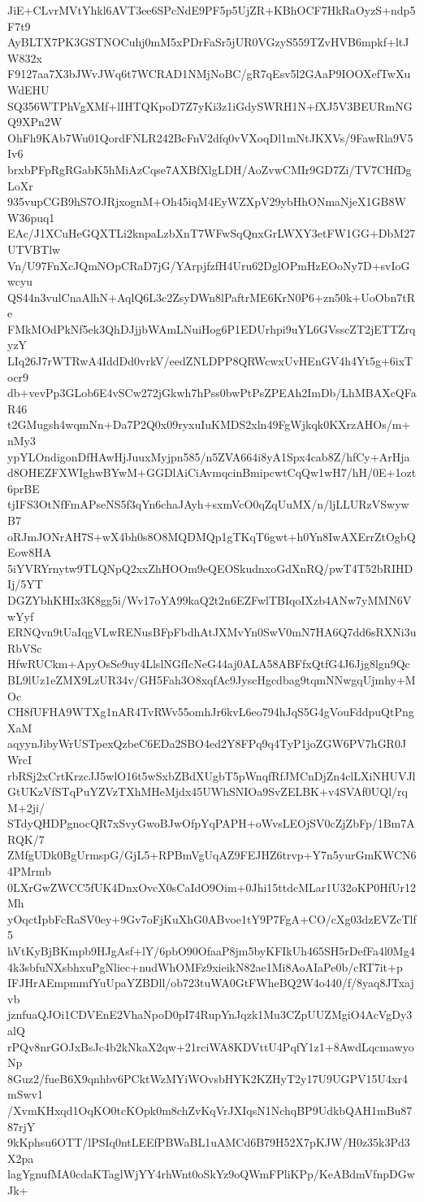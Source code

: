 JiE+CLvrMVtYhkl6AVT3ee6SPcNdE9PF5p5UjZR+KBhOCF7HkRaOyzS+ndp5F7t9
AyBLTX7PK3GSTNOCuhj0mM5xPDrFaSr5jUR0VGzyS559TZvHVB6mpkf+ltJW832x
F9127aa7X3bJWvJWq6t7WCRAD1NMjNoBC/gR7qEsv5l2GAaP9IOOXefTwXuWdEHU
SQ356WTPhVgXMf+lIHTQKpoD7Z7yKi3z1iGdySWRH1N+fXJ5V3BEURmNGQ9XPn2W
OhFh9KAb7Wu01QordFNLR242BcFnV2dfq0vVXoqDl1mNtJKXVs/9FawRla9V5Iv6
brxbPFpRgRGabK5hMiAzCqse7AXBfXlgLDH/AoZvwCMIr9GD7Zi/TV7CHfDgLoXr
935vupCGB9hS7OJRjxognM+Oh45iqM4EyWZXpV29ybHhONmaNjeX1GB8WW36puq1
EAc/J1XCuHeGQXTLi2knpaLzbXnT7WFwSqQnxGrLWXY3etFW1GG+DbM27UTVBTlw
Vn/U97FnXcJQmNOpCRaD7jG/YArpjfzfH4Uru62DglOPmHzEOoNy7D+svIoGwcyu
QS44n3vulCnaAlhN+AqlQ6L3c2ZsyDWn8lPaftrME6KrN0P6+zn50k+UoObn7tRe
FMkMOdPkNf5ek3QhDJjjbWAmLNuiHog6P1EDUrhpi9uYL6GVsscZT2jETTZrqyzY
LIq26J7rWTRwA4IddDd0vrkV/eedZNLDPP8QRWcwxUvHEnGV4h4Yt5g+6ixTocr9
db+vevPp3GLob6E4vSCw272jGkwh7hPss0bwPtPsZPEAh2ImDb/LhMBAXcQFaR46
t2GMugsh4wqmNn+Da7P2Q0x09ryxuIuKMDS2xln49FgWjkqk0KXrzAHOs/m+nMy3
ypYLOndigonDfHAwHjJuuxMyjpn585/n5ZVA664i8yA1Spx4cab8Z/hfCy+ArHja
d8OHEZFXWIghwBYwM+GGDlAiCiAvmqcinBmipcwtCqQw1wH7/hH/0E+1ozt6prBE
tjIFS3OtNfFmAPseNS5f3qYn6chaJAyh+sxmVcO0qZqUuMX/n/ljLLURzVSwywB7
oRJmJONrAH7S+wX4bh0s8O8MQDMQp1gTKqT6gwt+h0Yn8IwAXErrZtOgbQEow8HA
5iYVRYrnytw9TLQNpQ2xxZhHOOm9eQEOSkudnxoGdXnRQ/pwT4T52bRIHDIj/5YT
DGZYbhKHIx3K8gg5i/Wv17oYA99kaQ2t2n6EZFwlTBIqoIXzb4ANw7yMMN6VwYyf
ERNQvn9tUaIqgVLwRENusBFpFbdhAtJXMvYn0SwV0mN7HA6Q7dd6sRXNi3uRbVSc
HfwRUCkm+ApyOsSe9uy4LlslNGfIcNeG44aj0ALA58ABFfxQtfG4J6Jjg8lgn9Qc
BL9lUz1eZMX9LzUR34v/GH5Fah3O8xqfAc9JyscHgcdbag9tqmNNwgqUjmhy+MOc
CH8fUFHA9WTXg1nAR4TvRWv55omhJr6kvL6eo794hJqS5G4gVouFddpuQtPngXaM
aqyynJibyWrUSTpexQzbeC6EDa2SBO4ed2Y8FPq9q4TyP1joZGW6PV7hGR0JWrcI
rbRSj2xCrtKrzcJJ5wlO16t5wSxbZBdXUgbT5pWnqfRfJMCnDjZn4clLXiNHUVJl
GtUKzVfSTqPuYZVzTXhMHeMjdx45UWhSNIOa9SvZELBK+v4SVAf0UQl/rqM+2ji/
STdyQHDPgnocQR7xSvyGwoBJwOfpYqPAPH+oWvsLEOjSV0cZjZbFp/1Bm7ARQK/7
ZMfgUDk0BgUrmspG/GjL5+RPBmVgUqAZ9FEJHZ6trvp+Y7n5yurGmKWCN64PMrmb
0LXrGwZWCC5fUK4DnxOvcX0sCaIdO9Oim+0Jhi15ttdcMLar1U32oKP0HfUr12Mh
yOqctIpbFcRaSV0ey+9Gv7oFjKuXhG0ABvoe1tY9P7FgA+CO/cXg03dzEVZcTlf5
hVtKyBjBKmpb9HJgAsf+lY/6pbO90OfaaP8jm5byKFIkUh465SH5rDefFa4l0Mg4
4k3sbfuNXsbhxuPgNliec+nudWhOMFz9xieikN82ae1Mi8AoAIaPe0b/cRT7it+p
IFJHrAEmpmmfYuUpaYZBDll/ob723tuWA0GtFWheBQ2W4o440/f/8yaq8JTxajvb
jznfuaQJOi1CDVEnE2VhaNpoD0pI74RupYnJqzk1Mu3CZpUUZMgiO4AcVgDy3alQ
rPQv8nrGOJxBsJc4b2kNkaX2qw+21rciWA8KDVttU4PqfY1z1+8AwdLqcmawyoNp
8Guz2/fueB6X9qnhbv6PCktWzMYiWOvsbHYK2KZHyT2y17U9UGPV15U4xr4mSwv1
/XvmKHxqd1OqKO0tcKOpk0m8chZvKqVrJXIqsN1NchqBP9UdkbQAH1mBu8787rjY
9kKphsu6OTT/lPSIq0ntLEEfPBWaBL1uAMCd6B79H52X7pKJW/H0z35k3Pd3X2pa
lagYgnufMA0cdaKTaglWjYY4rhWnt0oSkYz9oQWmFPliKPp/KeABdmVfnpDGwJk+
